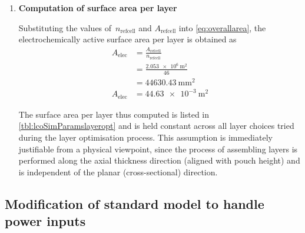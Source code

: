 \begin{enumerate}[ label=\textbf{\arabic*}), leftmargin=0pt, itemindent=20pt, labelwidth=15pt, labelsep=5pt, listparindent=0.7cm, align=left]
        Since fractional layers do not have  any physical meaning, the number of
        layers that  can be  accommodated within  any pouch  must be  an integer
        quantity. Therefore,  $n_\text{refcell}$~is  computed as the  `floor' of
        the quantity in the \gls{rhs} of \cref{eq:stackheightrefcellmod}
        \begin{align}
            n_\text{refcell} &= \floor*{\frac{L_\text{stack}}{l_\text{Al} + l_\text{pos} + l_\text{sep} + l_\text{neg} + l_\text{Cu}}} \\
            {} &= \floor*{\frac{9.68}{(15 +  72 + 25 + 88 + 10) \times 10^{-3}}} \\
            n_\text{refcell} &= 46
        \end{align}
        The reference cell is thus determined to consist of 46~layers.

    \item \textbf{Computation of surface area per layer}

        Substituting  the values  of~$n_\text{refcell}$ and  $A_\text{refcell}$
        into  \cref{eq:overallarea}, the  electrochemically active  surface area
        per layer is obtained as
        \begin{align}
            A_\text{elec} & = \frac{A_\text{refcell}}{n_\text{refcell}} \\
            {}            & = \frac{\SI{2.053e6}{\meter\squared}}{46}     \\
            {}            & = \SI{44630.43}{\milli\meter\squared}\\
            A_\text{elec} & = \SI{44.63e-3}{\meter\squared} 
        \end{align}

        The   surface   area   per   layer    thus   computed   is   listed   in
        \cref{tbl:lcoSimParamslayeropt} and  is held  constant across  all layer
        choices  tried during  the layer  optimisation process.  This assumption
        is  immediately  justifiable  from   a  physical  viewpoint,  since  the
        process  of assembling  layers is  performed along  the axial  thickness
        direction (aligned with  pouch height) and is independent  of the planar
        (cross-sectional) direction.

\end{enumerate}

\subsection{Modification of standard  model to handle power inputs}\label{sec:innatepowerinput}

